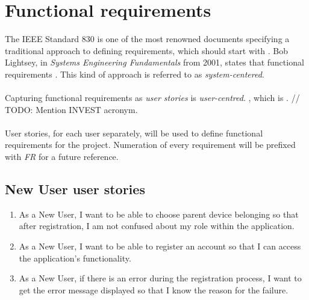 \section{Functional requirements}\label{sec:requirements:functional}
The IEEE Standard 830 \cite{trippIEEERecommendedPractice1993} is one of the most renowned documents specifying a traditional approach to defining requirements, which should start with . Bob Lightsey, in \textit{Systems Engineering Fundamentals} from 2001, states that functional requirements  \cite{lightseySystemsEngineeringFundamentals2001}. This kind of approach is referred to as \textit{system-centered}.
\\\\
Capturing functional requirements as \textit{user stories} is \textit{user-centred}. , which is  \cite{cohnUserStoriesApplied2004}.
// TODO: Mention INVEST acronym.
\\\\
User stories, for each user separately, will be used to define functional requirements for the project. Numeration of every requirement will be prefixed with \textit{FR} for a future reference.


\subsection{New User user stories}\label{subsec:requirements:functional:new}
\begin{enumerate}[label=FR \arabic*.,leftmargin=3\parindent]
\item\label{fr:new:device-belonging} As a New User, I want to be able to choose parent device belonging so that after registration, I am not confused about my role within the application.
\item\label{fr:new:create-account} As a New User, I want to be able to register an account so that I can access the application's functionality.
\item\label{fr:new:create-account-error} As a New User, if there is an error during the registration process, I want to get the error message displayed so that I know the reason for the failure.
\end{enumerate}



